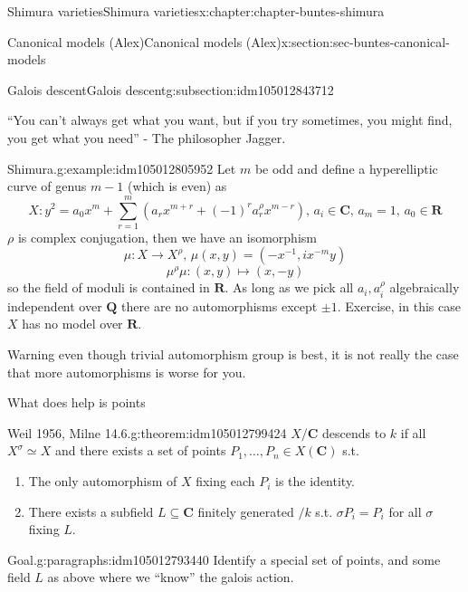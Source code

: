 \documentclass[oneside,10pt,]{book}
\numberwithin{equation}{section}
\newcommand{\inv}{^{-1}}
\newcommand{\QQ}{\mathbf{Q}}
\newcommand{\RR}{\mathbf{R}}
\newcommand{\CC}{\mathbf{C}}
\begin{document}
\begin{chapterptx}{Shimura varieties}{}{Shimura varieties}{}{}{x:chapter:chapter-buntes-shimura}
\begin{sectionptx}{Canonical models (Alex)}{}{Canonical models (Alex)}{}{}{x:section:sec-buntes-canonical-models}
\begin{subsectionptx}{Galois descent}{}{Galois descent}{}{}{g:subsection:idm105012843712}
\par
``You can't always get what you want, but if you try sometimes, you might find, you get what you need'' - The philosopher Jagger.%
\begin{example}{Shimura.}{g:example:idm105012805952}%
Let \(m\) be odd and define a hyperelliptic curve of genus \(m - 1\) (which is even) as%
\begin{equation*}
X\colon y^2 = a_0 x^m + \sum_{r= 1}^m (a_r x^{m+r} + (-1)^r a_r^\rho x^{m-r}),\,a_i \in \CC,\,a_m = 1,\,a_0 \in \RR
\end{equation*}
\(\rho\) is complex conjugation, then we have an isomorphism%
\begin{equation*}
\mu\colon X \to X^\rho,\,\mu(x,y) = (-x\inv, i x^{-m} y)
\end{equation*}
%
\begin{equation*}
\mu^\rho \mu \colon (x,y)\mapsto (x,-y)
\end{equation*}
so the field of moduli is contained in \(\RR\). As long as we pick all \(a_i,a_i^\rho\) algebraically independent over \(\QQ\) there are no automorphisms except \(\pm 1\). Exercise, in this case \(X\) has no model over \(\RR\).%
\end{example}
Warning even though trivial automorphism group is best, it is not really the case that more automorphisms is worse for you.%
\par
What does help is points%
\begin{theorem}{Weil 1956, Milne 14.6.}{}{g:theorem:idm105012799424}%
\(X/\CC\) descends to \(k\) if all \(X^\sigma \simeq X\) and there exists a set of points \(P_1,\ldots, P_n\in  X(\CC)\) s.t.%
\begin{enumerate}
\item{}The only automorphism of \(X\) fixing each \(P_i\) is the identity.%
\item{}There exists a subfield \(L \subseteq \CC\) finitely generated \(/k\) s.t. \(\sigma P_i = P_i\) for all \(\sigma\) fixing \(L\).%
\end{enumerate}
%
\end{theorem}
\begin{paragraphs}{Goal.}{g:paragraphs:idm105012793440}%
Identify a special set of points, and some field \(L\) as above where we ``know'' the galois action.%
\end{paragraphs}%
\end{subsectionptx}
%
%
\typeout{************************************************}
\typeout{************************************************}

\end{sectionptx}
\end{chapterptx}
\end{document}
